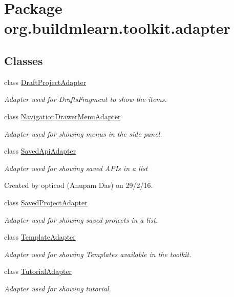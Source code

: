 \hypertarget{namespaceorg_1_1buildmlearn_1_1toolkit_1_1adapter}{}\section{Package org.\+buildmlearn.\+toolkit.\+adapter}
\label{namespaceorg_1_1buildmlearn_1_1toolkit_1_1adapter}
\subsection*{Classes}
\begin{DoxyCompactItemize}
\item 
class \hyperlink{classorg_1_1buildmlearn_1_1toolkit_1_1adapter_1_1DraftProjectAdapter}{Draft\+Project\+Adapter}
\begin{DoxyCompactList}\small\item\em Adapter used for Drafts\+Fragment to show the items. \end{DoxyCompactList}\item 
class \hyperlink{classorg_1_1buildmlearn_1_1toolkit_1_1adapter_1_1NavigationDrawerMenuAdapter}{Navigation\+Drawer\+Menu\+Adapter}
\begin{DoxyCompactList}\small\item\em Adapter used for showing menus in the side panel. \end{DoxyCompactList}\item 
class \hyperlink{classorg_1_1buildmlearn_1_1toolkit_1_1adapter_1_1SavedApiAdapter}{Saved\+Api\+Adapter}
\begin{DoxyCompactList}\small\item\em Adapter used for showing saved A\+P\+Is in a list 

Created by opticod (Anupam Das) on 29/2/16. \end{DoxyCompactList}\item 
class \hyperlink{classorg_1_1buildmlearn_1_1toolkit_1_1adapter_1_1SavedProjectAdapter}{Saved\+Project\+Adapter}
\begin{DoxyCompactList}\small\item\em Adapter used for showing saved projects in a list. \end{DoxyCompactList}\item 
class \hyperlink{classorg_1_1buildmlearn_1_1toolkit_1_1adapter_1_1TemplateAdapter}{Template\+Adapter}
\begin{DoxyCompactList}\small\item\em Adapter used for showing Templates available in the toolkit. \end{DoxyCompactList}\item 
class \hyperlink{classorg_1_1buildmlearn_1_1toolkit_1_1adapter_1_1TutorialAdapter}{Tutorial\+Adapter}
\begin{DoxyCompactList}\small\item\em Adapter used for showing tutorial. \end{DoxyCompactList}\end{DoxyCompactItemize}
